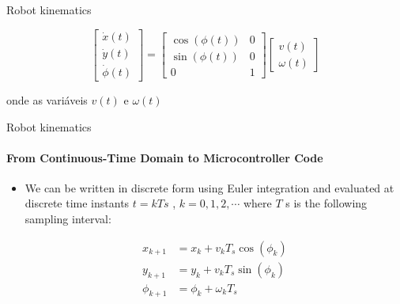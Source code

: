 \documentclass[aspectratio=169]{beamer}
\begin{document}
\begin{frame}{Robot kinematics}
\begin{itemize}
              \begin{equation*}
                  \boxed{
                      \begin{bmatrix}
                          \dot{x}(t) \\
                          \dot{y}(t) \\
                          \dot{\phi}(t)
                      \end{bmatrix}
                      =
                      \begin{bmatrix}
                          \cos(\phi(t)) & 0 \\
                          \sin(\phi(t)) & 0 \\
                          0             & 1
                      \end{bmatrix}
                      \begin{bmatrix}
                          v(t) \\
                          \omega(t)
                      \end{bmatrix}}
              \end{equation*}

              onde as variáveis $v(t)$ e $\omega(t)$


    \end{itemize}
\end{frame}


\begin{frame}{Robot kinematics}
    \framesubtitle{ From Continuous-Time Domain to Microcontroller Code}
    \begin{itemize}
        \item  We can be written in discrete form using Euler integration and evaluated at discrete time
        instants $t = kTs$ , $k = 0, 1, 2, \cdots$ where $T$ s is the following sampling interval:

              \begin{equation*}
                  \begin{split}
                      x_{k+1} &= x_k + v_k T_s\cos(\phi_k) \\
                      y_{k+1} &= y_k + v_k T_s\sin(\phi_k) \\
                      \phi_{k+1} &= \phi_k + \omega_k T_s \\
                  \end{split}
              \end{equation*}
    \end{itemize}
\end{frame}
\end{document}
